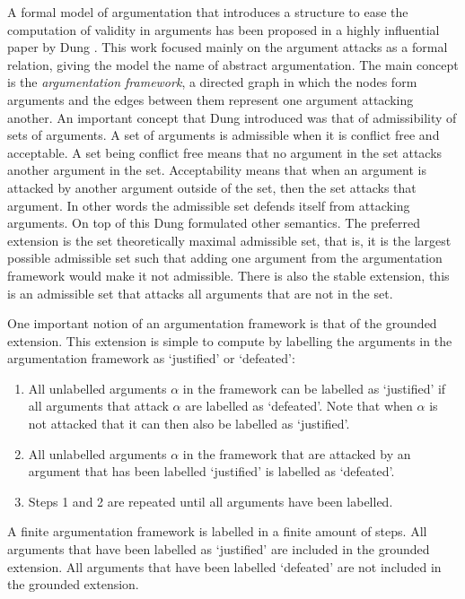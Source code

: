 \documentclass[a4paper]{article}
\begin{document}
A formal model of argumentation that introduces a structure to ease the 
computation of validity in arguments has been proposed in a highly influential 
paper by Dung \cite{dung1995}. This work focused mainly on the argument attacks 
as a formal relation, giving the model the name of abstract argumentation. The 
main concept is the \emph{argumentation framework}, a directed graph in which 
the nodes form arguments and the edges between them represent one argument 
attacking another. An important concept that Dung introduced was that of 
admissibility of sets of arguments. A set of arguments is admissible when it is 
conflict free and acceptable. A set being conflict free means that no argument 
in the set attacks another argument in the set. Acceptability means that when 
an argument is attacked by another argument outside of the set, then the set 
attacks that argument. In other words the admissible set defends itself from 
attacking arguments. On top of this Dung formulated other semantics. The 
preferred extension is the set theoretically maximal admissible set, that is, 
it is the largest possible admissible set such that adding one argument from 
the argumentation framework would make it not admissible. There is also the 
stable extension, this is an admissible set that attacks all arguments that are 
not in the set.

One important notion of an argumentation framework is that of the grounded 
extension. This extension is simple to compute by labelling the arguments in 
the argumentation framework as `justified' or `defeated':
\begin{enumerate}
	\item All unlabelled arguments $\alpha$ in the framework can be labelled as 
	`justified' if all arguments that attack $\alpha$ are labelled as 
	`defeated'. Note that when $\alpha$ is not attacked that it can then also 
	be labelled as `justified'.
	\item All unlabelled arguments $\alpha$ in the framework that are attacked 
	by an argument that has been labelled `justified' is labelled as `defeated'.
	\item Steps 1 and 2 are repeated until all arguments have been labelled.
\end{enumerate}
A finite argumentation framework is labelled in a finite amount of steps. All 
arguments that have been labelled as `justified' are included in the grounded 
extension. All arguments that have been labelled `defeated' are not included in 
the grounded extension.
\end{document}
